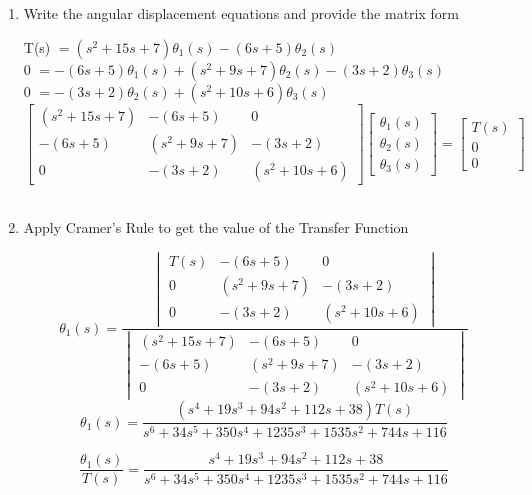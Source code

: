 \begin{fold}
\begin{enumerate}[label=(\alph*),itemindent=*, itemindent=*, leftmargin=*, nolistsep]
		\item Write the angular displacement equations and provide the matrix form
\begin{center}
	T(s) $= (s^2 + 15s + 7)\theta_1(s) - (6s + 5)\theta_2(s)$\\
	0 $= -(6s+5)\theta_1(s) + (s^2 + 9s + 7)\theta_2(s) - (3s + 2)\theta_3(s)$\\
	0 $= -(3s+2)\theta_2(s) + (s^2 + 10s + 6)\theta_3(s)$
	\[
		\begin{bmatrix}
		(s^2 + 15s + 7) & -(6s + 5) & 0\\
		-(6s + 5) & (s^2 + 9s + 7) & -(3s + 2)\\
		0 & -(3s + 2) & (s^2 + 10s + 6)
		\end{bmatrix}
		\begin{bmatrix}
		\theta_1(s) \\
		\theta_2(s) \\
		\theta_3(s)
		\end{bmatrix}
		=
		\begin{bmatrix}
		T(s)\\
		0\\
		0
		\end{bmatrix}
	\]\\
\end{center}
		\item Apply Cramer's Rule to get the value of the Transfer Function
\begin{center}
	\[
		\theta_1(s) = 
			\frac{\begin{vmatrix}
				T(s) & -(6s + 5) & 0\\
				0 & (s^2 + 9s + 7) & -(3s + 2)\\
				0 & -(3s + 2) & (s^2 + 10s + 6)
			\end{vmatrix}
		}{\begin{vmatrix}
				(s^2 + 15s + 7) & -(6s + 5) & 0\\
				-(6s + 5) & (s^2 + 9s + 7) & -(3s + 2)\\
				0 & -(3s + 2) & (s^2 + 10s + 6)
			\end{vmatrix}
		}
	\]
	\[
	\theta_1(s) = \frac{(s^4 + 19s^3 + 94s^2 + 112s + 38)T(s)}{s^6 + 34s^5 + 350s^4 + 1235s^3 + 1535s^2 + 744s + 116}
	\] 

	\[
	\boxed{\frac{\theta_1(s)}{T(s)} = \frac{s^4 + 19s^3 + 94s^2 + 112s + 38}{s^6 + 34s^5 + 350s^4 + 1235s^3 + 1535s^2 + 744s + 116}}
	\]
\end{center}
	\end{enumerate}


\end{fold}

